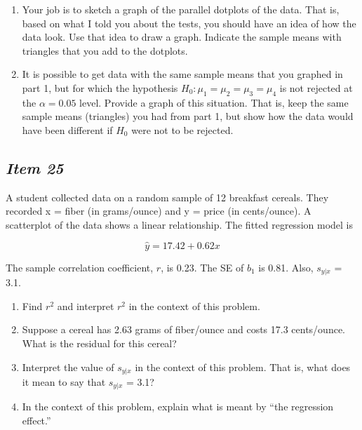 \begin{enumerate}[leftmargin=1cm, itemsep=.2em]


\item Your job is to sketch a graph of the parallel dotplots of the data. That is, based on what I told you about the tests, you should have an idea of how the data look. Use that idea to draw a graph. Indicate the sample means with triangles that you add to the dotplots.


\item It is possible to get data with the same sample means that you graphed in part 1, but for which the hypothesis $H_0: \mu_1=\mu_2=\mu_3=\mu_4$ is not rejected at the $\alpha = 0.05$ level. Provide a graph of this situation. That is, keep the same sample means (triangles) you had from part 1, but show how the data would have been different if $H_0$ were not to be rejected.


\end{enumerate}





\subsection{\textbf{\textit{Item 25}}}


A student collected data on a random sample of 12 breakfast cereals. They recorded x = fiber (in grams/ounce) and y = price (in cents/ounce). A scatterplot of the data shows a linear relationship. The fitted regression model is





\begin{equation*}
\hat{y} = 17.42 + 0.62x
\end{equation*}





The sample correlation coefficient, $r$, is 0.23. The SE of $b_1$ is 0.81. Also, $s_{y|x}$ = 3.1.


\begin{enumerate}[leftmargin=1cm, itemsep=.2em]


\item Find $r^2$ and interpret $r^2$ in the context of this problem.


\item Suppose a cereal has 2.63 grams of fiber/ounce and costs 17.3 cents/ounce. What is the residual for this cereal?


\item Interpret the value of $s_{y|x}$ in the context of this problem. That is, what does it mean to say that $s_{y|x}$ = 3.1?


\item In the context of this problem, explain what is meant by ``the regression effect.''


\end{enumerate}





